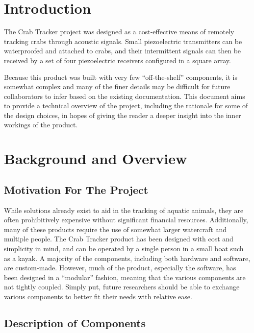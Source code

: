 \documentclass[12pt]{article}
\begin{document}
\section{Introduction}

The Crab Tracker project was designed as a cost-effective means of remotely
tracking crabs through acoustic signals.
Small piezoelectric transmitters can be waterproofed and attached to crabs,
and their intermittent signals can then be received by a set of four
piezoelectric receivers configured in a square array.

Because this product was built with very few ``off-the-shelf'' components,
it is somewhat complex and many of the finer details may be difficult for
future collaborators to infer based on the existing documentation.
This document aims to provide a technical overview of the project, including
the rationale for some of the design choices, in hopes of giving the reader
a deeper insight into the inner workings of the product.

\section{Background and Overview}

\subsection{Motivation For The Project}

While solutions already exist to aid in the tracking of aquatic animals,
they are often prohibitively expensive without significant financial resources.
Additionally, many of these products require the use of somewhat larger
watercraft and multiple people.
The Crab Tracker product has been designed with cost and simplicity in mind,
and can be operated by a single person in a small boat such as a kayak.
A majority of the components, including both hardware and software, are
custom-made.
However, much of the product, especially the software, has been designed
in a ``modular'' fashion, meaning that the various components are not tightly
coupled.
Simply put, future researchers should be able to exchange various components
to better fit their needs with relative ease.

\subsection{Description of Components}
\end{document}
